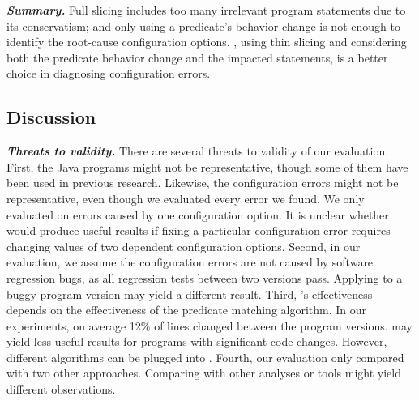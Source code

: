 \vspace{1mm}
\noindent \textbf{\textit{Summary.}} Full slicing
includes too many irrelevant program statements due to its
conservatism; and only using a predicate's behavior
change is not enough to identify the root-cause configuration options.
\ourtool, using thin slicing and considering both
the predicate behavior change and the impacted statements,
is a better choice in diagnosing configuration errors.

\subsection{Discussion}

\noindent \textbf{\textit{Threats to validity.}}
There are several threats to validity of our evaluation.
First, the \subjnum Java programs might not be representative, though some of them have been
used in previous research. Likewise, the
\errornum configuration errors might not be representative, even though we
evaluated every error we found. 
We only evaluated \ourtool on errors
caused by one configuration option.
It is unclear whether \ourtool would produce
useful results if fixing a particular configuration error
requires changing values of two dependent configuration options.
%
Second, in our evaluation, we assume the configuration errors
are not caused by software regression bugs, as all regression
tests between two versions pass. Applying \ourtool to a buggy
program version may yield a different result.
Third, \ourtool's effectiveness depends on the effectiveness of the
predicate matching algorithm.
In our experiments, on average 12\% of lines changed between the program
versions.
\ourtool may yield less
useful results for programs with significant code changes.
However, different algorithms can be plugged into \ourtool.
Fourth, our evaluation only compared \ourtool with two other
approaches. Comparing with other analyses or tools might yield
different observations.

